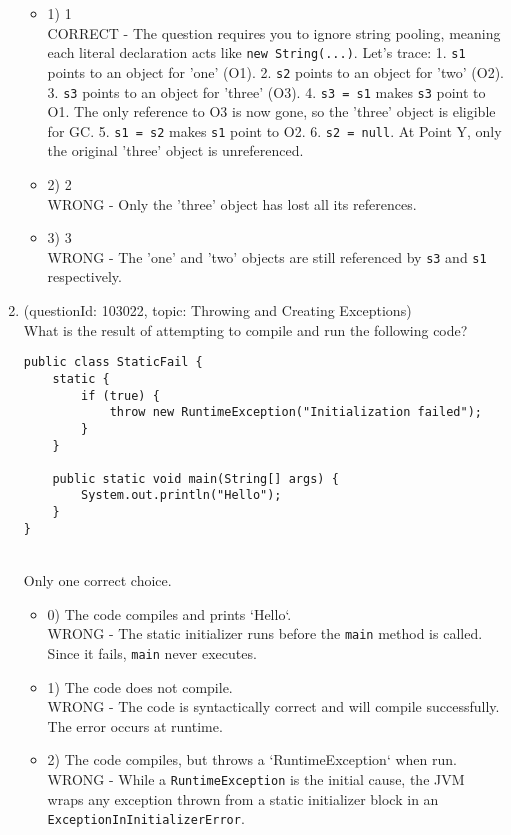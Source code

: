 \documentclass[12pt]{article}
\begin{document}
\begin{enumerate}[label=(\arabic*)]
\begin{itemize}
\item 1) 1
 \\ 
CORRECT - The question requires you to ignore string pooling, meaning each literal declaration acts like \verb|new String(...)|. Let's trace: 1. \verb|s1| points to an object for 'one' (O1). 2. \verb|s2| points to an object for 'two' (O2). 3. \verb|s3| points to an object for 'three' (O3). 4. \verb|s3 = s1| makes \verb|s3| point to O1. The only reference to O3 is now gone, so the 'three' object is eligible for GC. 5. \verb|s1 = s2| makes \verb|s1| point to O2. 6. \verb|s2 = null|. At Point Y, only the original 'three' object is unreferenced.

\item 2) 2
 \\ 
WRONG - Only the 'three' object has lost all its references.

\item 3) 3
 \\ 
WRONG - The 'one' and 'two' objects are still referenced by \verb|s3| and \verb|s1| respectively.

\end{itemize}
\item (questionId: 103022, topic: Throwing and Creating Exceptions) \\ 
What is the result of attempting to compile and run the following code?
\begin{verbatim}
public class StaticFail {
    static {
        if (true) {
            throw new RuntimeException("Initialization failed");
        }
    }

    public static void main(String[] args) {
        System.out.println("Hello");
    }
}
\end{verbatim}
\\ \noindent Only one correct choice. 
\begin{itemize}
\item 0) The code compiles and prints `Hello`.
 \\ 
WRONG - The static initializer runs before the \verb|main| method is called. Since it fails, \verb|main| never executes.

\item 1) The code does not compile.
 \\ 
WRONG - The code is syntactically correct and will compile successfully. The error occurs at runtime.

\item 2) The code compiles, but throws a `RuntimeException` when run.
 \\ 
WRONG - While a \verb|RuntimeException| is the initial cause, the JVM wraps any exception thrown from a static initializer block in an \verb|ExceptionInInitializerError|.


\end{itemize}
\end{enumerate}
\end{document}
